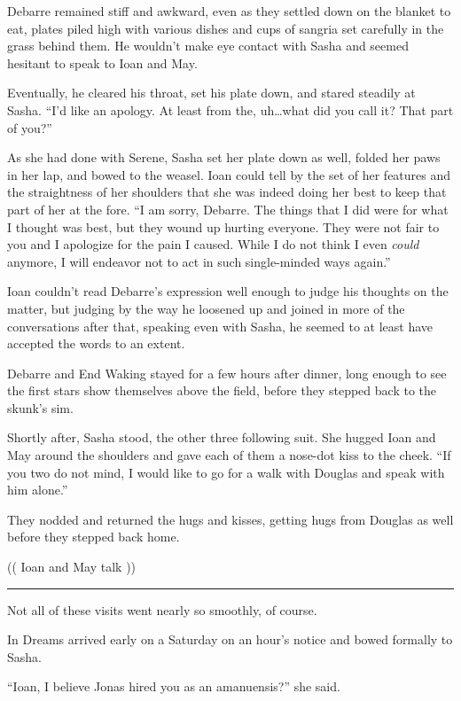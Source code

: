 Debarre remained stiff and awkward, even as they settled down on the blanket to eat, plates piled high with various dishes and cups of sangria set carefully in the grass behind them. He wouldn't make eye contact with Sasha and seemed hesitant to speak to Ioan and May.

Eventually, he cleared his throat, set his plate down, and stared steadily at Sasha. ``I'd like an apology. At least from the, uh\ldots what did you call it? That part of you?''

As she had done with Serene, Sasha set her plate down as well, folded her paws in her lap, and bowed to the weasel. Ioan could tell by the set of her features and the straightness of her shoulders that she was indeed doing her best to keep that part of her at the fore. ``I am sorry, Debarre. The things that I did were for what I thought was best, but they wound up hurting everyone. They were not fair to you and I apologize for the pain I caused. While I do not think I even \emph{could} anymore, I will endeavor not to act in such single-minded ways again.''

Ioan couldn't read Debarre's expression well enough to judge his thoughts on the matter, but judging by the way he loosened up and joined in more of the conversations after that, speaking even with Sasha, he seemed to at least have accepted the words to an extent.

Debarre and End Waking stayed for a few hours after dinner, long enough to see the first stars show themselves above the field, before they stepped back to the skunk's sim.

Shortly after, Sasha stood, the other three following suit. She hugged Ioan and May around the shoulders and gave each of them a nose-dot kiss to the cheek. ``If you two do not mind, I would like to go for a walk with Douglas and speak with him alone.''

They nodded and returned the hugs and kisses, getting hugs from Douglas as well before they stepped back home.

(( Ioan and May talk ))

\begin{center}\rule{0.5\linewidth}{0.5pt}\end{center}

Not all of these visits went nearly so smoothly, of course.

In Dreams arrived early on a Saturday on an hour's notice and bowed formally to Sasha.

``Ioan, I believe Jonas hired you as an amanuensis?'' she said.

